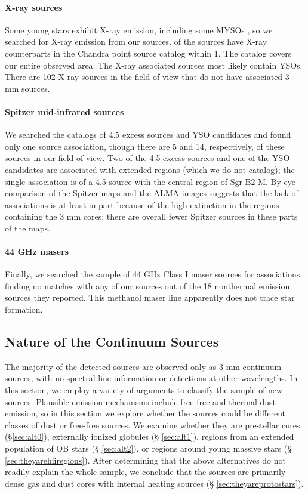\documentclass[twocolumn]{aastex61}
\begin{document}
\paragraph{X-ray sources}
Some young stars exhibit X-ray emission, including some MYSOs
\citep[e.g.,][]{Townsley2014a}, so we searched for X-ray emission from our
sources.  \nxraymatch of the sources have X-ray counterparts in the
\citet{Muno2009a} Chandra point source catalog within 1\arcsec.  The
\citet{Muno2009a} catalog covers our entire observed area.  The X-ray
associated sources most likely contain YSOs.  There are 102 X-ray sources in
the field of view that do not have associated 3 mm sources.

\paragraph{Spitzer mid-infrared sources}
We searched the \citet{Yusef-Zadeh2009a} catalogs of 4.5 \um excess sources and
YSO candidates and found only one source association, though there are 5 and
14, respectively, of these sources in our field of view.  Two of the 4.5 \um
excess sources and one of the YSO candidates are associated with extended \hii
regions (which we do not catalog); the single association is of a 4.5 \um source with the central region
of Sgr B2 M. By-eye comparison of the Spitzer maps and the ALMA images suggests
that the lack of associations is at least in part because of the high
extinction in the regions containing the 3 mm cores; there are overall fewer
Spitzer sources in these parts of the maps.

\paragraph{44 GHz \methanol masers}
Finally, we searched the \citet{Mehringer1997a} sample of 44 GHz Class I
\methanol maser sources for associations, finding no matches with any of our
sources out of the 18 nonthermal \methanol emission sources they reported.
This methanol maser line apparently does not trace star formation.


\subsection{Nature of the Continuum Sources}
\label{sec:classification}
The majority of the detected sources are observed only as 3 mm continuum
sources, with no spectral line information or detections at other wavelengths.
In this section, we employ a variety of arguments to classify the sample of new
sources.    Plausible emission mechanisms include free-free and thermal dust
emission, so in this section we explore whether the sources could be different
classes of dust or free-free sources.  We examine whether they are
prestellar cores (\S \ref{sec:alt0}), externally ionized globules (\S
\ref{sec:alt1}), \hii regions from an extended population of OB stars (\S
\ref{sec:alt2}), or \hii regions around young massive stars (\S
\ref{sec:theyarehiiregions}).  After determining that the above alternatives do
not readily explain the whole sample, we conclude that the sources are
primarily dense gas and dust cores with internal heating sources (\S
\ref{sec:theyareprotostars}).
\end{document}
